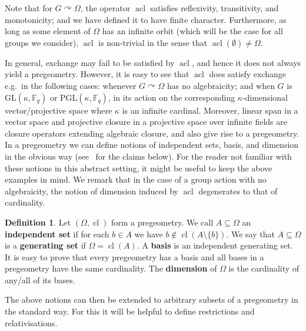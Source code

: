 \documentclass{article}
\theoremstyle{remark}
\theoremstyle{definition}
\newtheorem{definition}[theorem]{Definition}
\def\acts{\curvearrowright}
\DeclareMathOperator{\cl}{cl}
\DeclareMathOperator{\acl}{acl}
\begin{document}
{{Note that for $G\acts\Omega$, the operator $\acl$ satisfies reflexivity, transitivity, and monotonicity; and we have defined it to have finite character. Furthermore, as long as some element of $\Omega$ has an infinite orbit (which will be the case for all groups we consider), $\acl$ is non-trivial in the sense that $\acl(\emptyset)\neq \Omega$. %


In general, exchange may fail to be satisfied by  $\acl$, and hence it does not always %
yield 
a pregeometry. However,  it
is easy to see that $\acl$ does satisfy exchange e.g.~in the following cases: whenever $G\acts\Omega$ has no algebraicity; and  when $G$ is $\mathrm{GL}(\kappa, \mathbb{F}_q)$ or $\mathrm{PGL}(\kappa, \mathbb{F}_q)$, in its action on the corresponding $\kappa$-dimensional vector/projective space where $\kappa$ is an infinite cardinal. {Moreover, linear span in a vector space and projective closure in a projective space over infinite fields are closure operators extending algebraic closure, and also give rise to a pregeometry.} In a pregeometry we can define notions of independent sets, basis, and dimension in the obvious way (see~\cite[Appendix C]{tent2012course} for the claims below). For the reader not familiar with these  notions in this abstract setting, it might be useful to keep the above examples in mind. We remark that in the case of {a group action with} no algebraicity, the notion of dimension {induced by $\acl$} degenerates to that of  cardinality.

\begin{definition} Let $(\Omega, \cl)$ form a pregeometry. We call  $A\subseteq \Omega$ an \textbf{independent set} if for each $b\in A$ we have $b\not\in\cl(A\setminus\{b\})$. We say that $A\subseteq \Omega$ is a \textbf{generating set} if $\Omega=\cl(A)$. A \textbf{basis} %
is an independent generating set. It is easy to prove that every pregeometry has a basis and all bases in a pregeometry have the same cardinality. The \textbf{dimension} of $\Omega$ is the cardinality of any/all of its bases.  
\end{definition}


The above notions can then be extended to arbitrary subsets of a pregeometry in the standard way. For this it will be helpful to define restrictions and relativisations.

}}
\end{document}
